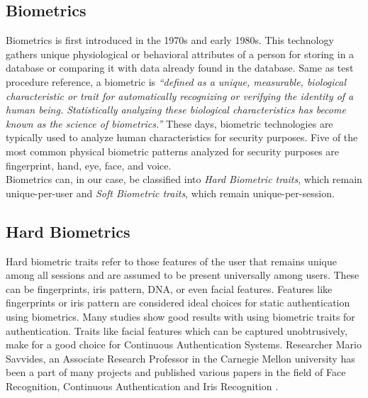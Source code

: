 \documentclass[12pt]{report}			%
\begin{document}
\subsection{ Biometrics }
Biometrics is first introduced in the 1970s and early 1980s. This technology gathers unique physiological or behavioral attributes of a person for storing in a database or comparing it with data already found in the database. Same as test procedure reference, a biometric is \emph{“defined as a unique, measurable, biological characteristic or trait for automatically recognizing or verifying the identity of a human being. Statistically analyzing these biological characteristics has become known as the science of biometrics.”} These days, biometric technologies are typically used to analyze human characteristics for security purposes. Five of the most common physical biometric patterns analyzed for security purposes are fingerprint, hand, eye, face, and voice.\\
Biometrics can, in our case, be classified into \emph{Hard Biometric traits}, which remain unique-per-user and \emph{Soft Biometric traits}, which remain unique-per-session.

\subsection{ Hard Biometrics}
Hard biometric traits refer to those features of the user that remains unique among all sessions and are assumed to be present universally among users. These can be fingerprints, iris pattern, DNA, or even facial features. Features like fingerprints or iris pattern are considered ideal choices for static authentication using biometrics. Many studies \cite{war02,john03,way97,kang06} show good results with using biometric traits for authentication. Traits like facial features which can be captured unobtrusively, make for a good choice for Continuous Authentication Systems. Researcher Mario Savvides, an Associate Research Professor in the Carnegie Mellon university has been a part of many projects and published various papers in the field of Face Recognition, Continuous Authentication and Iris Recognition \cite{marsav}. 
\end{document}
